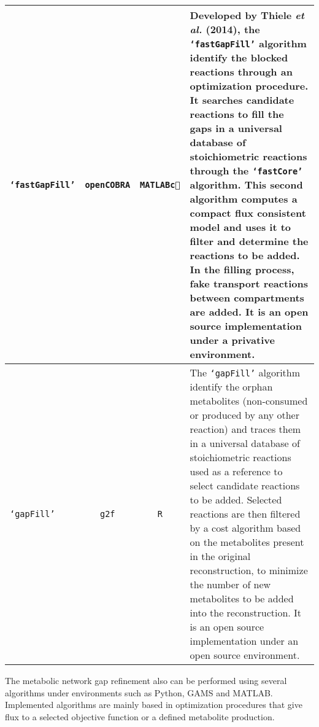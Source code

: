 \begin{center}
\begin{longtable}{|m{3.6cm}|c|c|m{6.8cm}|}
\hline
\texttt{`fastGapFill'} \cite{Thiele2014gf}&\texttt{openCOBRA}&\texttt{MATLAB\textcircled{c}} & {\small Developed by Thiele \textit{et al.} (2014), the \texttt{`fastGapFill'} algorithm identify the blocked reactions through an optimization procedure. It searches candidate reactions to fill the gaps in a universal database of stoichiometric reactions through the \texttt{`fastCore'} algorithm. This second algorithm computes a compact flux consistent model and uses it to filter and determine the reactions to be added. In the filling process, fake transport reactions between compartments are added. It is an open source implementation under a privative environment.}\\
\hline
\texttt{`gapFill'}\cite{G2F}&\texttt{g2f}&\texttt{R} & {\small The \texttt{`gapFill'} algorithm identify the orphan metabolites (non-consumed or produced by any other reaction) and traces them in a universal database of stoichiometric reactions used as a reference to select candidate reactions to be added. Selected reactions are then filtered by a cost algorithm based on the metabolites present in the original reconstruction, to minimize the number of new metabolites to be added into the reconstruction. It is an open source implementation under an open source environment.}\\
\hline
\end{longtable}
\end{center}

The metabolic network gap refinement also can be performed using several algorithms under environments such as Python, GAMS and MATLAB. Implemented algorithms are mainly based in optimization procedures that give flux to a selected objective function or a defined metabolite production.\\
 
